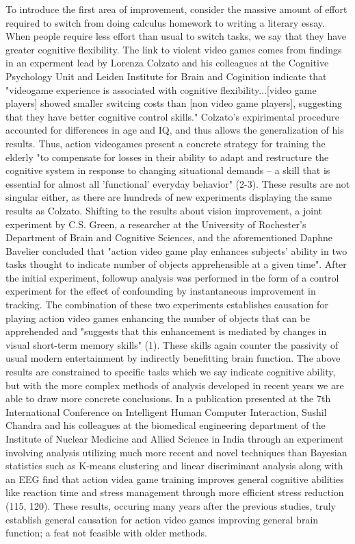\documentclass[12pt]{article}
\begin{document}
\begin{flushleft}
To introduce the first area of improvement, consider the massive amount of effort required to switch from doing calculus homework to writing a literary essay.
When people require less effort than usual to switch tasks, we say that they have greater cognitive flexibility. The link to violent video games comes from findings in an experment lead by Lorenza Colzato and his colleagues at the Cognitive Psychology Unit and Leiden Institute for Brain and Coginition indicate that "videogame experience is associated with cognitive flexibility...[video game players] showed smaller switcing costs than [non video game players], suggesting that they have better cognitive control skills." Colzato's expirimental procedure accounted for differences in age and IQ, and thus allows the generalization of his results. Thus, action videogames present a concrete strategy for training the elderly "to compensate for losses in their ability to adapt and restructure the cognitive system in response to changing situational demands -- a skill that is essential for almost all 'functional' everyday behavior" (2-3). These results are not singular either, as there are hundreds of new experiments displaying the same results as Colzato.
Shifting to the results about vision improvement, a joint experiment by C.S. Green, a researcher at the University of Rochester's Department of Brain and Cognitive Sciences, and the aforementioned Daphne Bavelier concluded that "action video game play enhances subjects' ability in two tasks thought to indicate number of objects apprehensible at a given time". After the initial experiment, followup analysis was performed in the form of a control experiment for the effect of confounding by instantaneous improvement in tracking. The combination of these two experiments establishes causation for playing action video games enhancing the number of objects that can be apprehended and "suggests that this enhancement is mediated by changes in visual short-term memory skills" (1). These skills again counter the passivity of usual modern entertainment by indirectly benefitting brain function. The above results are constrained to specific tasks which we say indicate cognitive ability, but with the more complex methods of analysis developed in recent years we are able to draw more concrete conclusions.
In a publication presented at the 7th International Conference on Intelligent Human Computer Interaction, Sushil Chandra and his colleagues at the  biomedical engineering department of the Institute of Nuclear Medicine and Allied Science in India through an experiment involving analysis utilizing much more recent and novel techniques than Bayesian statistics such as K-means clustering and linear discriminant analysis along with an EEG find that action videa game training improves general cognitive abilities like reaction time and stress management through more efficient stress reduction (115, 120). These results, occuring many years after the previous studies, truly establish general causation for action video games improving general brain function; a feat not feasible with older methods.

\end{flushleft}
\end{document}

